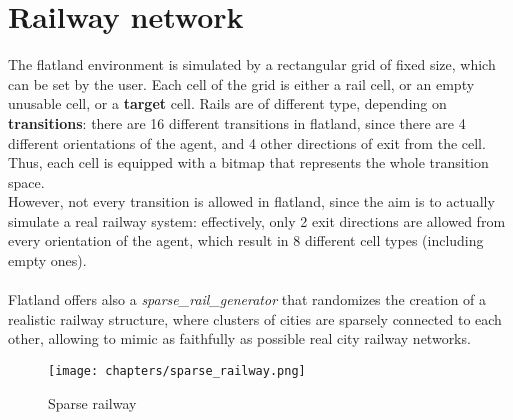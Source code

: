 \section{Railway network}
The flatland environment is simulated by a rectangular grid of fixed size, which can be set by the user. Each cell of the grid is either a rail cell, or an empty unusable cell, or a \textbf{target} cell. Rails are of different type, depending on \textbf{transitions}: there are 16 different transitions in flatland, since there are 4 different orientations of the agent, and 4 other directions of exit from the cell. Thus, each cell is equipped with a bitmap that represents the whole transition space. \\ However, not every transition is allowed in flatland, since the aim is to actually simulate a real railway system: effectively, only 2 exit directions are allowed from every orientation of the agent, which result in 8 different cell types (including empty ones).\\ \\
Flatland offers also a \textit{sparse\_rail\_generator} that randomizes the creation of a realistic railway structure, where clusters of cities are sparsely connected to each other, allowing to mimic as faithfully as possible real city railway networks.

\begin{figure}[H] 
\texttt{[image: chapters/sparse\_railway.png]}
\centering
\caption{Sparse railway}
\label{fig:s1} 
\end{figure}

